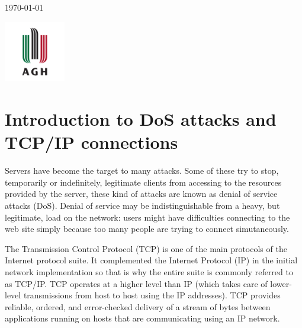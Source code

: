 \documentclass[11pt]{article}
\begin{document}
\begin{titlepage}
	\vfill\vfill\vfill %
	
	{\large\today} %
	
	
	\vfill\vfill
	\includegraphics[width=0.2\textwidth]{agh-logo.png}\\[1cm] %
	 
	
	\vfill %
	
\end{titlepage}


\tableofcontents
\clearpage


\section{Introduction to DoS attacks and TCP/IP connections}
Servers have become the target to many attacks. Some of these try to stop, temporarily or indefinitely, legitimate clients from accessing to the resources provided by the server, these kind of attacks are known as denial of service attacks (DoS). Denial of service may be indistinguishable from a heavy, but legitimate, load on the network: users might have difficulties connecting to the web site simply because too many people are trying to connect simutaneously.\vspace{5mm}

The Transmission Control Protocol (TCP) is one of the main protocols of the Internet protocol suite. It complemented the Internet Protocol (IP) in the initial network implementation so that is why the entire suite is commonly referred to as TCP/IP. TCP operates at a higher level than IP (which takes care of lower-level transmissions from host to host using the IP addresses). TCP provides reliable, ordered, and error-checked delivery of a stream of bytes between applications running on hosts that are communicating using an IP network.\vspace{5mm}
\end{document}
